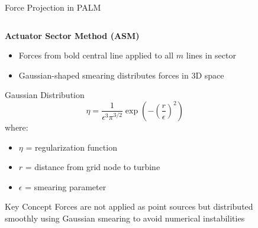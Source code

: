 \documentclass[aspectratio=1610]{beamer}
\begin{document}
\begin{frame}{Force Projection in PALM}

    \begin{columns}[T]
        \begin{column}{0.55\textwidth}
            \textbf{Actuator Sector Method (ASM)}
            \begin{itemize}
            \small
                \item Forces from bold central line applied to all $m$ lines in sector
                \item Gaussian-shaped smearing distributes forces in 3D space
            \end{itemize}
            
            \begin{block}{Gaussian Distribution}
                \begin{equation*}
                    \eta = \frac{1}{\epsilon^3 \pi^{3/2}} \exp\left(-\left(\frac{r}{\epsilon}\right)^2\right)
                \end{equation*}
                where:
                \begin{itemize}
                    \small
                    \item $\eta$ = regularization function
                    \item $r$ = distance from grid node to turbine
                    \item $\epsilon$ = smearing parameter
                \end{itemize}
            \end{block}
            \begin{alertblock}{Key Concept}
                \small
                Forces are not applied as point sources but distributed smoothly using Gaussian smearing to avoid numerical instabilities
            \end{alertblock}
        \end{column}
        
        \begin{column}{0.43\textwidth}
            \begin{figure}
                \centering
\end{figure}
\end{column}
\end{columns}
\end{frame}
\end{document}
